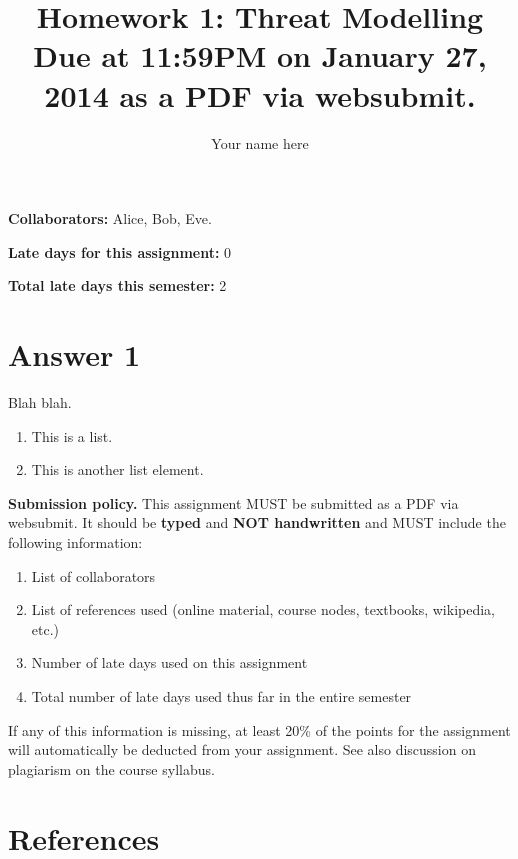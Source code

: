 \documentclass[11pt]{article}
\providecommand{\myparab}[1]{\smallskip\noindent\textbf{#1} }
\theoremstyle{definition}
\begin{document}
\title{Homework 1: Threat Modelling\\ Due at 11:59PM on January 27, 2014 as a PDF via websubmit.}
\author{Your name here}
\maketitle

\thispagestyle{fancy}

\myparab{Collaborators: }  Alice, Bob, Eve.

\myparab{Late days for this assignment: } 0

\myparab{Total late days this semester: } 2
 
 
\section*{Answer 1}

Blah blah.

\begin{enumerate}
\item This is a list.
\item This is another list element.
\end{enumerate} 

\noindent\hrulefill

\myparab{Submission policy.} This assignment MUST be submitted as a PDF via websubmit.  It should be \textbf{typed} and \textbf{NOT handwritten} and MUST include the following information:
\begin{enumerate}\itemsep1pt
\item List of collaborators
\item List of references used (online material, course nodes, textbooks, wikipedia, etc.)
\item Number of late days used on this assignment
\item Total number of late days used thus far in the entire semester
\end{enumerate}
{If any of this information is missing, at least 20\% of the points for the assignment will automatically be deducted from your assignment.  See also discussion on plagiarism on the course syllabus.}

\noindent\hrulefill

\section*{References}
\end{document}

